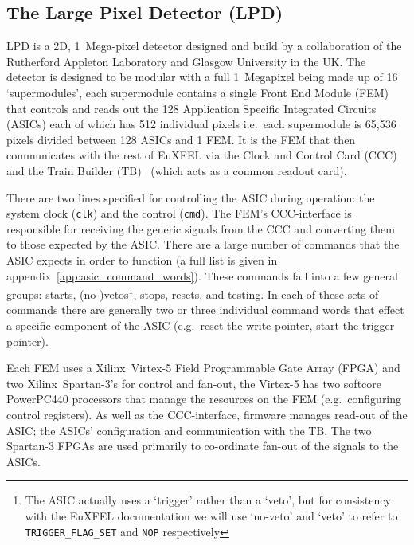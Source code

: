 \subsection{The Large Pixel Detector (LPD)} %
\label{sub:the_large_pixel_detector_lpd}
LPD is a 2D, 1~Mega-pixel detector designed and build by a collaboration of the Rutherford Appleton Laboratory and Glasgow University in the UK. The detector is designed to be modular with a full 1~Megapixel being made up of 16 `supermodules', each supermodule contains a single Front End Module (FEM) that controls and reads out the 128 Application Specific Integrated Circuits (ASICs) each of which has 512 individual pixels i.e.\ each supermodule is 65,536 pixels divided between 128 ASICs and 1 FEM. It is the FEM that then communicates with the rest of EuXFEL via the Clock and Control Card (CCC) and the Train Builder (TB)~\cite{xfel_train_builder} (which acts as a common readout card).
    
There are two lines specified for controlling the ASIC during operation: the system clock (\texttt{clk}) and the control (\texttt{cmd}). The FEM's CCC-interface is responsible for receiving the generic signals from the CCC and converting them to those expected by the ASIC. There are a large number of commands that the ASIC expects in order to function (a full list is given in appendix~\ref{app:asic_command_words}). These commands fall into a few general groups: starts, (no-)vetos\footnote{The ASIC actually uses a `trigger' rather than a `veto', but for consistency with the EuXFEL documentation we will use `no-veto' and `veto' to refer to \texttt{TRIGGER\_FLAG\_SET} and \texttt{NOP} respectively}, stops, resets, and testing. In each of these sets of commands there are generally two or three individual command words that effect a specific component of the ASIC (e.g.\ reset the write pointer, start the trigger pointer). 
    
Each FEM uses a Xilinx~Virtex-5 Field Programmable Gate Array (FPGA) and two Xilinx~Spartan-3's for control and fan-out, the Virtex-5 has two softcore PowerPC440 processors that manage the resources on the FEM (e.g.\ configuring control registers). As well as the CCC-interface, firmware manages read-out of the ASIC; the ASICs' configuration and communication with the TB. The two Spartan-3 FPGAs are used primarily to co-ordinate fan-out of the signals to the ASICs.
